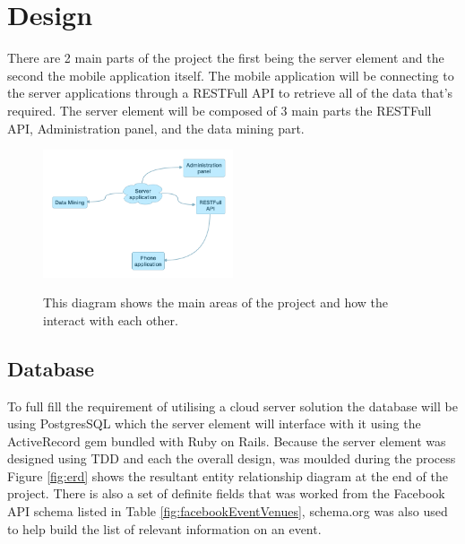 \chapter{Design}
	There are 2 main parts of the project the first being the server element and the second the mobile application itself. The mobile application will be connecting to the server applications through a RESTFull API to retrieve all of the data that's required. The server element will be composed of 3 main parts the RESTFull API, Administration panel, and the data mining part.
	\begin{figure}[ht] %
			\caption[Overview design]{This diagram shows the main areas of the project and how the interact with each other. }
			\centering
			\includegraphics[width=0.5\textwidth]{Images/overview-design}
			\label{fig:overview-design}
		\end{figure}
	
	\section{Database}
		To full fill the requirement of utilising a cloud server solution the database will be using PostgresSQL which the server element will interface with it using the ActiveRecord gem bundled with Ruby on Rails. Because the server element was designed using TDD and each the overall design, was moulded during the process Figure \ref{fig:erd} shows the resultant entity relationship diagram at the end of the project. There is also a set of definite fields that was worked from the Facebook API schema listed in Table \ref{fig:facebookEventVenues}, schema.org\cite{schemaEvent} was also used to help build the list of relevant information on an event. 

